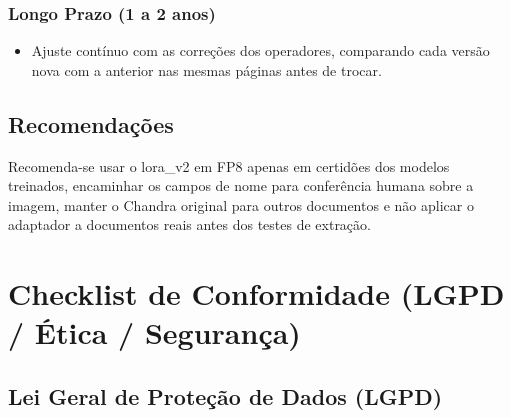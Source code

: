 \documentclass[12pt,a4paper]{article}
\begin{document}
\subsubsection{Longo Prazo (1 a 2 anos)}
\begin{itemize}
    \item Ajuste contínuo com as correções dos operadores, comparando cada versão nova com a anterior nas mesmas páginas antes de trocar.
\end{itemize}

\subsection{Recomendações}
Recomenda-se usar o lora\_v2 em FP8 apenas em certidões dos modelos treinados, encaminhar os campos de nome para conferência humana sobre a imagem, manter o Chandra original para outros documentos e não aplicar o adaptador a documentos reais antes dos testes de extração.

\section{Checklist de Conformidade (LGPD / Ética / Segurança)}
\label{sec:checklist}

\subsection{Lei Geral de Proteção de Dados (LGPD)}
\end{document}
